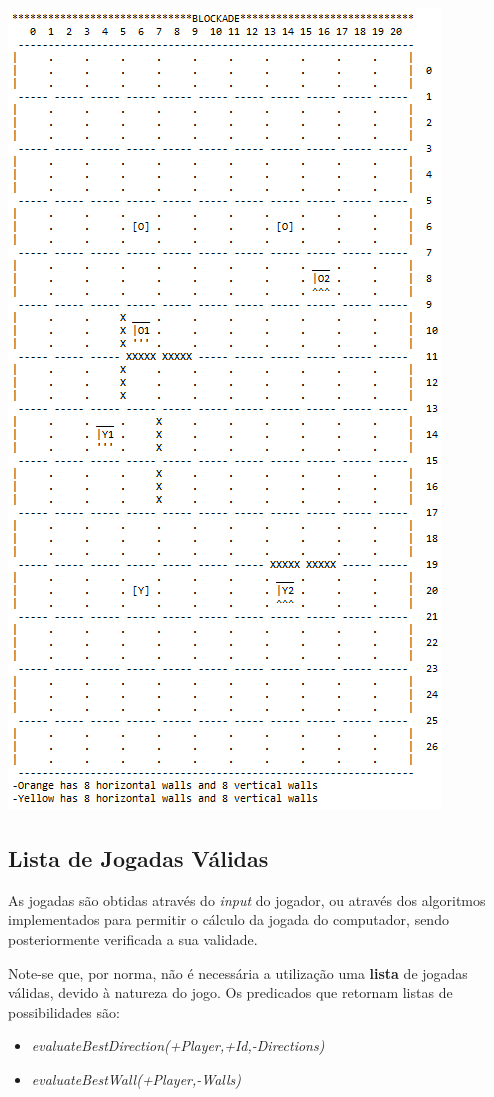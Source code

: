 \documentclass[a4paper]{article}
\begin{document}
\begin{center}
\includegraphics[scale = 0.68]{fig4.png}
\end{center}


\subsection{Lista de Jogadas Válidas} 

As jogadas são obtidas através do \textit{input} do jogador, ou através dos algoritmos implementados para permitir o cálculo da jogada do computador, sendo posteriormente verificada a sua validade. \par
Note-se que, por norma, não é necessária a utilização uma \textbf{lista} de jogadas válidas, devido à natureza do jogo. Os predicados que retornam listas de possibilidades são:
\begin{itemize}
	\item  \textit{evaluateBestDirection(+Player,+Id,-Directions)}
	\item 	\textit{evaluateBestWall(+Player,-Walls)}
\end{itemize}
\end{document}
